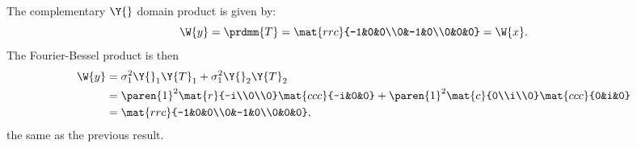 The complementary $\Y{}$ domain product is given by:
\begin{equation}
  \W{y} = \prdmm{T} = \mat{rrc}{-1&0&0\\0&-1&0\\0&0&0} = \W{x}.
\end{equation}
The Fourier-Bessel product is then
\begin{equation}
  \begin{split}
    \W{y} &= \sigma_{1}^{2} \Y{}_{1}\Y{T}_{1} + \sigma_{1}^{2} \Y{}_{2}\Y{T}_{2}\\
      &= \paren{1}^{2} \mat{r}{-i\\0\\0} \mat{ccc}{-i&0&0} + \paren{1}^{2} \mat{c}{0\\i\\0} \mat{ccc}{0&i&0}\\
      &= \mat{rrc}{-1&0&0\\0&-1&0\\0&0&0},
  \end{split}
\end{equation}
the same as the previous result.

\endinput